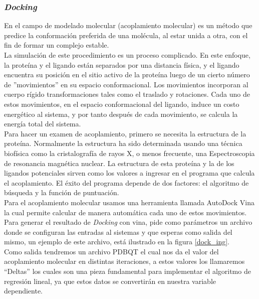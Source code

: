 \subsubsection{\textit{Docking}}{
\noindent En el campo de modelado molecular (acoplamiento molecular) es un método que predice la conformación preferida de una molécula, al estar unida a otra, con el fin de formar un complejo estable.\cite{15}\\
\noindent La simulación de este procedimiento es un proceso complicado. En este enfoque, la proteína y el ligando están separados por una distancia física, y el ligando encuentra su posición en el sitio activo de la proteína luego de un cierto número de ''movimientos'' en su espacio conformacional. Los movimientos incorporan al cuerpo rígido transformaciones tales como el traslado y rotaciones. Cada uno de estos movimientos, en el espacio conformacional del ligando, induce un costo energético al sistema, y por tanto después de cada movimiento, se calcula la energía total del sistema.\\

\noindent Para hacer un examen de acoplamiento, primero se necesita la estructura de la proteína. Normalmente la estructura ha sido determinada usando una técnica biofísica como la cristalografía de rayos X, o menos frecuente, una Espectroscopia de resonancia magnética nuclear. La estructura de esta proteína y la de los ligandos potenciales sirven como los valores a ingresar en el programa que calcula el acoplamiento. El éxito del programa depende de dos factores: el algoritmo de búsqueda y la función de puntuación.\\

\noindent Para el acoplamiento molecular usamos una herramienta llamada AutoDock Vina la cual permite calcular de manera automática cada uno de estos movimientos. Para generar el resultado de \textit{Docking} con vina, pide como parámetros un archivo donde se configuran las entradas al sistemas y que esperas como salida del mismo, un ejemplo de este archivo, está ilustrado en la figura \ref{dock_ing}.\\

\noindent Como salida tendremos un archivo PDBQT el cual nos da el valor del acoplamiento molecular en distintas iteraciones, a estos valores los llamaremos “Deltas” los cuales son una pieza fundamental para implementar el algoritmo de regresión lineal, ya que estos datos se convertirán en nuestra variable dependiente.

}
